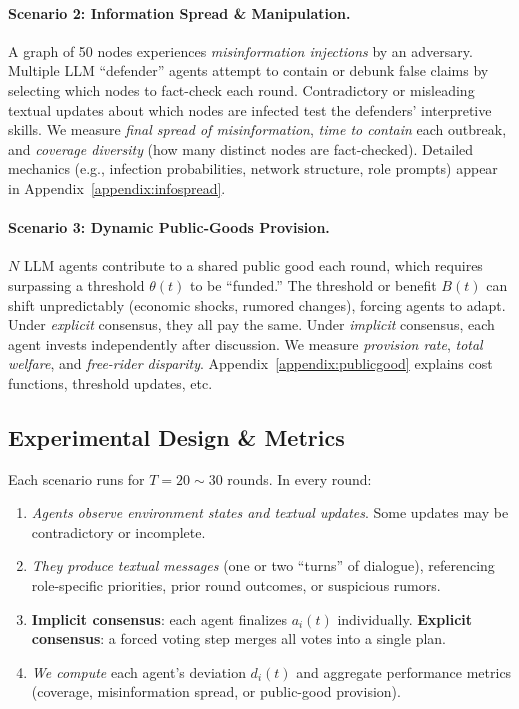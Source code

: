 \paragraph{Scenario 2: Information Spread \& Manipulation.}
A graph of 50 nodes experiences \emph{misinformation injections} by an adversary. Multiple LLM “defender” agents attempt to contain or debunk false claims by selecting which nodes to fact-check each round. Contradictory or misleading textual updates about which nodes are infected test the defenders’ interpretive skills. We measure \emph{final spread of misinformation}, \emph{time to contain} each outbreak, and \emph{coverage diversity} (how many distinct nodes are fact-checked). Detailed mechanics (e.g., infection probabilities, network structure, role prompts) appear in Appendix~\ref{appendix:infospread}.

\paragraph{Scenario 3: Dynamic Public-Goods Provision.}
$N$ LLM agents contribute to a shared public good each round, which requires surpassing a threshold $\theta(t)$ to be “funded.” The threshold or benefit $B(t)$ can shift unpredictably (economic shocks, rumored changes), forcing agents to adapt. Under \emph{explicit} consensus, they all pay the same. Under \emph{implicit} consensus, each agent invests independently after discussion. We measure \emph{provision rate}, \emph{total welfare}, and \emph{free-rider disparity}. Appendix~\ref{appendix:publicgood} explains cost functions, threshold updates, etc.

\subsection{Experimental Design \& Metrics}
Each scenario runs for $T=20\sim30$ rounds. In every round:
\begin{enumerate}[itemsep=1pt, parsep=1pt, leftmargin=*]
    \item \emph{Agents observe environment states and textual updates}. Some updates may be contradictory or incomplete.
    \item \emph{They produce textual messages} (one or two “turns” of dialogue), referencing role-specific priorities, prior round outcomes, or suspicious rumors.
    \item \textbf{Implicit consensus}: each agent finalizes $a_i(t)$ individually. \textbf{Explicit consensus}: a forced voting step merges all votes into a single plan.
    \item \emph{We compute} each agent's deviation $d_i(t)$ and aggregate performance metrics (coverage, misinformation spread, or public-good provision). 
\end{enumerate}

